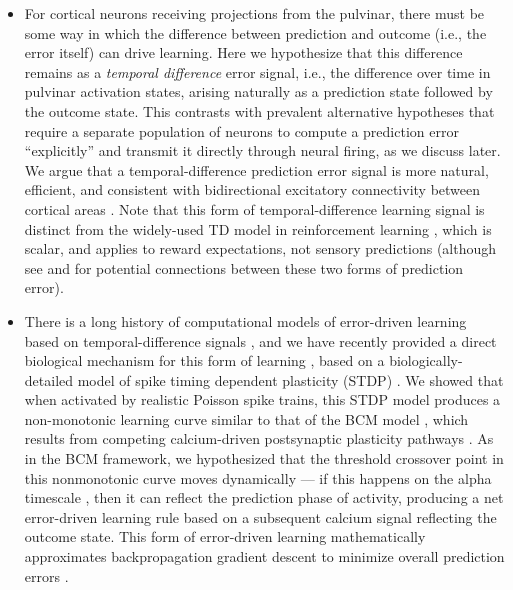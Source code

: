 \documentclass[11pt,twoside]{article}
\newif\myifpdf
\begin{document}
\begin{itemize}
	\item For cortical neurons receiving projections from the pulvinar, there must be some way in which the difference between prediction and outcome (i.e., the error itself) can drive learning.  Here we hypothesize that this difference remains as a \emph{temporal difference} error signal, i.e., the difference over time in pulvinar activation states, arising naturally as a prediction state followed by the outcome state.  This contrasts with prevalent alternative hypotheses that require a separate population of neurons to compute a prediction error ``explicitly'' and transmit it directly through neural firing, as we discuss later.  We argue that a temporal-difference prediction error signal is more natural, efficient, and consistent with bidirectional excitatory connectivity between cortical areas \citep{RumelhartMcClelland82,Hopfield84,DesimoneDuncan95,ReynoldsChelazziDesimone99,MillerCohen01,OReillyWyatteHerdEtAl13}.  Note that this form of temporal-difference learning signal is distinct from the widely-used TD model in reinforcement learning \citep{SuttonBarto98}, which is scalar, and applies to reward expectations, not sensory predictions (although see \citealp{GardnerSchoenbaumGershman18} and \citealp{Dayan93} for potential connections between these two forms of prediction error).

	\item There is a long history of computational models of error-driven learning based on temporal-difference signals \citep{AckleyHintonSejnowski85,OReilly96,BengioMesnardFischerEtAl17,WhittingtonBogacz19,LillicrapSantoroMarrisEtAl20}, and we have recently provided a direct biological mechanism for this form of learning \citep{OReillyMunakataFrankEtAl12}, based on a biologically-detailed model of spike timing dependent plasticity (STDP) \citep{UrakuboHondaFroemkeEtAl08}.  We showed that when activated by realistic Poisson spike trains, this STDP model produces a non-monotonic learning curve similar to that of the BCM model \citep{BienenstockCooperMunro82}, which results from competing calcium-driven postsynaptic plasticity pathways \citep{ShouvalBearCooper02,CooperBear12}.  As in the BCM framework, we hypothesized that the threshold crossover point in this nonmonotonic curve moves dynamically --- if this happens on the alpha timescale \citep{LimMcKeeWoloszynEtAl15}, then it can reflect the prediction phase of activity, producing a net error-driven learning rule based on a subsequent calcium signal reflecting the outcome state.  This form of error-driven learning mathematically approximates backpropagation gradient descent to minimize overall prediction errors \citep{OReilly96}.
\end{itemize}
\end{document}

